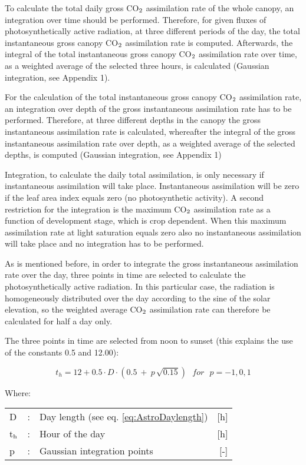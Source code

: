 To calculate the total daily gross CO$_{{\rm 2}}$ assimilation rate of the whole canopy, an integration over time should be performed. Therefore, for given fluxes of photosynthetically
active radiation, at three different periods of the day, the total instantaneous gross canopy
CO$_{{\rm 2}}$ assimilation rate is computed. Afterwards, the integral of the total instantaneous
gross canopy CO$_{{\rm 2}}$ assimilation rate over time, as a weighted average of the selected three
hours, is calculated (Gaussian integration, see Appendix 1).

For the calculation of the total instantaneous gross canopy CO$_{{\rm 2}}$ assimilation rate, an
integration over depth of the gross instantaneous assimilation rate has to be performed.
Therefore, at three different depths in the canopy the gross instantaneous assimilation rate
is calculated, whereafter the integral of the gross instantaneous assimilation rate over
depth, as a weighted average of the selected depths, is computed (Gaussian integration,
see Appendix 1)

Integration, to calculate the daily total assimilation, is only necessary if instantaneous
assimilation will take place. Instantaneous assimilation will be zero if the leaf area index
equals zero (no photosynthetic activity). A second restriction for the integration is the
maximum CO$_{{\rm 2}}$ assimilation rate as a function of development stage, which is crop
dependent. When this maximum assimilation rate at light saturation equals zero also no
instantaneous assimilation will take place and no integration has to be performed.

As is mentioned before, in order to integrate the gross instantaneous assimilation rate
over the day, three points in time are selected to calculate the photosynthetically active
radiation. In this particular case, the radiation is homogeneously distributed over the day
according to the sine of the solar elevation, so the weighted average CO$_{{\rm 2}}$ 
assimilation rate can therefore be calculated for half a day only.

The three points in time are selected from noon to sunset (this explains the use of the
constants 0.5 and 12.00):

\begin{equation}
t_{h} = 12 + 0.5 \cdot D \cdot (0.5 ~+~ p\, \sqrt{0.15}) ~~~ for ~~~ p = -1,0,1
\end{equation}

Where:\\[5pt]
\begin{tabularx}{\textwidth}{llXr}
	D &:& Day length (see eq. \ref{eq:AstroDaylength})    &    [h]\\
	t$_{{\rm h}}$ &:& Hour of the day  &      [h]\\
	p &:& Gaussian integration points  &      [-]\\
\end{tabularx}

